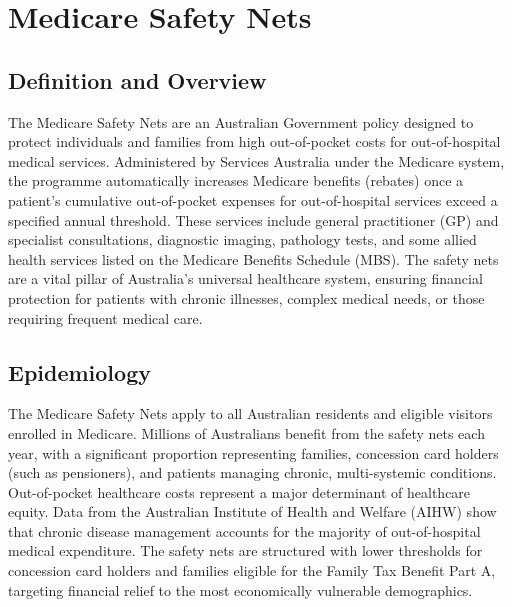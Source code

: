 \chapter{Medicare Safety Nets}

\section*{Definition and Overview}
The Medicare Safety Nets are an Australian Government policy designed to protect individuals and families from high out-of-pocket costs for out-of-hospital medical services. Administered by Services Australia under the Medicare system, the programme automatically increases Medicare benefits (rebates) once a patient's cumulative out-of-pocket expenses for out-of-hospital services exceed a specified annual threshold. These services include general practitioner (GP) and specialist consultations, diagnostic imaging, pathology tests, and some allied health services listed on the Medicare Benefits Schedule (MBS). The safety nets are a vital pillar of Australia's universal healthcare system, ensuring financial protection for patients with chronic illnesses, complex medical needs, or those requiring frequent medical care.

\section*{Epidemiology}
The Medicare Safety Nets apply to all Australian residents and eligible visitors enrolled in Medicare. Millions of Australians benefit from the safety nets each year, with a significant proportion representing families, concession card holders (such as pensioners), and patients managing chronic, multi-systemic conditions. Out-of-pocket healthcare costs represent a major determinant of healthcare equity. Data from the Australian Institute of Health and Welfare (AIHW) show that chronic disease management accounts for the majority of out-of-hospital medical expenditure. The safety nets are structured with lower thresholds for concession card holders and families eligible for the Family Tax Benefit Part A, targeting financial relief to the most economically vulnerable demographics.

